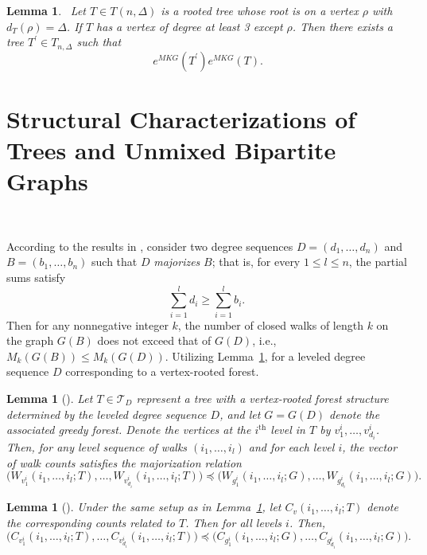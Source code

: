 \documentclass{article}
\newtheorem{lemma}[theorem]{Lemma}
\theoremstyle{definition}
\begin{document}
\begin{lemma}~\label{rebaslem1javr}
Let $T \in T(n, \Delta)$ is a rooted tree whose root is on a vertex $\rho$ with $d_{T}(\rho)=\Delta$. If $T$ has a vertex of degree at least 3 except $\rho$. Then there exists a tree $T^{\prime} \in T_{n, \Delta}$ such that 
\begin{equation}~\label{eq1rebaslem1javr}
e^{M K G}\left(T^{\prime}\right)e^{M K G}(T).
\end{equation}
\end{lemma}



\section{Structural Characterizations of Trees and Unmixed Bipartite Graphs}~\label{sec4}

According to the results in \cite{Andriantiana2013WagnerEOD}, consider two degree sequences $D=(d_1,\dots,d_n)$ and $B=(b_1,\dots,b_n)$ such that $D$ \emph{majorizes} $B$; that is, for every $1 \leq l \leq n$, the partial sums satisfy 
\[
\sum_{i=1}^l d_i \geq \sum_{i=1}^l b_i.
\]
Then for any nonnegative integer $k$, the number of closed walks of length $k$ on the graph $G(B)$ does not exceed that of $G(D)$, i.e., $M_k(G(B)) \leq M_k(G(D))$. Utilizing Lemma~\ref{lempapern1}, for a leveled degree sequence $D$ corresponding to a vertex-rooted forest.

\begin{lemma}[\cite{Andriantiana2013WagnerEOD}]\label{lempapern1}
Let $T \in \mathcal{T}_D$ represent a tree with a vertex-rooted forest structure determined by the leveled degree sequence $D$, and let $G=G(D)$ denote the associated greedy forest. Denote the vertices at the $i^{\text{th}}$ level in $T$ by $v_1^i,\dots,v_{d_i}^i$. Then, for any level sequence of walks $(i_1,\dots,i_l)$ and for each level $i$, the vector of walk counts satisfies the majorization relation
\[
\bigl(W_{v_1^i}(i_1,\dots,i_l;T), \dots, W_{v_{d_i}^i}(i_1,\dots,i_l;T)\bigr) \preccurlyeq \bigl(W_{g_1^i}(i_1,\dots,i_l;G), \dots, W_{g_{d_i}^i}(i_1,\dots,i_l;G) \bigr).
\]
\end{lemma}

\begin{lemma}[\cite{Andriantiana2013WagnerEOD}]
Under the same setup as in Lemma~\ref{lempapern1}, let $C_v(i_1,\dots,i_l;T)$ denote the corresponding counts related to $T$. Then for all levels $i$. Then, 
\[
\bigl(C_{v_1^i}(i_1,\dots,i_l;T), \dots, C_{v_{d_i}^i}(i_1,\dots,i_l;T) \bigr) \preccurlyeq \bigl(C_{g_1^i}(i_1,\dots,i_l;G), \dots, C_{g_{d_i}^i}(i_1,\dots,i_l;G) \bigr).
\]

\end{lemma}
\end{document}
